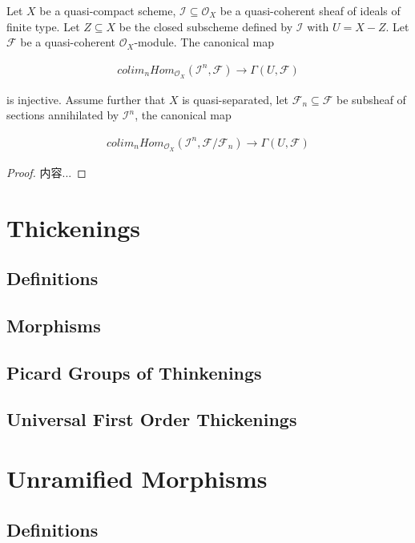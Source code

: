 \documentclass[Total.tex]{subfiles}
\begin{document}
			\begin{lemma}
				Let $X$ be a quasi-compact scheme, $\mathcal{I}\subseteq \mathcal{O}_X$ be a quasi-coherent sheaf of ideals of finite type. Let $Z\subseteq X$ be the closed subscheme defined by $\mathcal{I}$ with $U=X-Z$. Let $\mathcal{F}$ be a quasi-coherent $\mathcal{O}_X$-module. The canonical map
				
				\begin{gather*}
					colim_n Hom_{\mathcal{O}_X} (\mathcal{I}^n,\mathcal{F})\rightarrow \Gamma(U,\mathcal{F})
				\end{gather*}
				
				is injective. Assume further that $X$ is quasi-separated, let $\mathcal{F}_n\subseteq \mathcal{F}$ be subsheaf of sections annihilated by $\mathcal{I}^n$, the canonical map
				
				\begin{gather*}
					colim_n Hom_{\mathcal{O}_X} (\mathcal{I}^n,\mathcal{F}/\mathcal{F}_n)\rightarrow \Gamma(U,\mathcal{F})
				\end{gather*}
			\end{lemma}
			
			\begin{proof}
				内容...
			\end{proof}
		\section{Thickenings}
			\subsection{Definitions}
			\subsection{Morphisms}
			\subsection{Picard Groups of Thinkenings}
			\subsection{Universal First Order Thickenings}
		\section{Unramified Morphisms}
			\subsection{Definitions}
\end{document}
